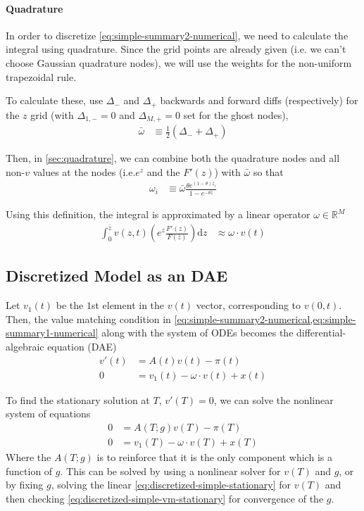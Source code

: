 \documentclass[11pt]{article}
\newcommand{\R}{\ensuremath{\mathbb{R}}}
\newcommand{\diff}{\ensuremath{\mathrm{d}}}
\begin{document}
\paragraph{Quadrature}
In order to discretize \cref{eq:simple-summary2-numerical}, we need to calculate the integral using quadrature.  Since the grid points are already given (i.e. we can't choose Gaussian quadrature nodes), we will use the weights for the non-uniform trapezoidal rule.

To calculate these, use $\Delta_{-}$ and $\Delta_{+}$ backwards and forward diffs (respectively) for the $z$ grid (with $\Delta_{1,-} = 0$ and $\Delta_{M,+} = 0$ set for the ghost nodes),
\begin{align}
\bar{\omega}&\equiv \frac1{2}(\Delta_{-} + \Delta_{+})
\end{align}

Then, in \cref{sec:quadrature}, we can combine both the quadrature nodes and all non-$v$ values at the nodes (i.e.$e^z$ and the $F'(z)$) with $\bar{\omega}$ so that
\begin{align}
\omega_i &\equiv \bar{\omega} \frac{\theta e^{(1 - \theta)z_i}}{1 - e^{-\theta \bar{z}}}
\end{align}

\noindent Using this definition, the integral is approximated by a linear operator $\omega\in\R^M$
\begin{align}
 \int_{0}^{\bar{z}}  v(z,t) \left(e^z \frac{F'(z)}{F(\bar{z})}\right) \diff z &\approx \omega \cdot v(t)
\end{align}

\subsection{Discretized Model as an DAE}
Let $v_1(t)$ be the $1$st element in the $v(t)$ vector, corresponding to $v(0,t)$.  Then, the value matching condition in \cref{eq:simple-summary2-numerical,eq:simple-summary1-numerical} along with the system of ODEs becomes the differential-algebraic equation (DAE)
\begin{align}
	v'(t) &= A(t) v(t) - \pi(t)\label{eq:discretized-simple}\\
	0 &= v_1(t) - \omega \cdot v(t) + x(t)\label{eq:discretized-simple-vm}
\end{align}


To find the stationary solution at $T$,  $v'(T) = 0$, we can solve the nonlinear system of equations
\begin{align}
	0 &= A(T; g) v(T) - \pi(T)\label{eq:discretized-simple-stationary}\\
	0 &= v_1(T) - \omega \cdot v(T) + x(T)\label{eq:discretized-simple-vm-stationary}
\end{align}
Where the $ A(T; g)$ is to reinforce that it is the only component which is a function of $g$.  This can be solved by using a nonlinear solver for $v(T)$ and $g$, or by fixing $g$, solving the linear \cref{eq:discretized-simple-stationary} for $v(T)$ and then checking \cref{eq:discretized-simple-vm-stationary} for convergence of the $g$.
\end{document}
